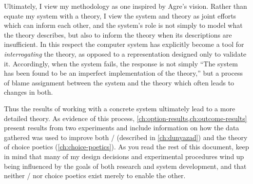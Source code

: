Ultimately, I view my methodology as one inspired by Agre's vision.
%
Rather than equate my system with a theory, I view the system and theory as joint efforts which can inform each other, and the system's role is not simply to model what the theory describes, but also to inform the theory when its descriptions are insufficient.
%
In this respect the computer system has explicitly become a tool for \emph{interrogating} the theory, as opposed to a representation designed only to validate it.
%
Accordingly, when the system fails, the response is not simply ``The system has been found to be an imperfect implementation of the theory,'' but a process of blame assignment between the system and the theory which often leads to changes in both.


Thus the results of working with a concrete system ultimately lead to a more detailed theory.
%
As evidence of this process, \cref{ch:option-results,ch:outcome-results} present results from two experiments and include information on how the data gathered was used to improve both \dunyazad/ (described in \cref{ch:dunyazad}) and the theory of choice poetics (\cref{ch:choice-poetics}).
%
As you read the rest of this document, keep in mind that many of my design decisions and experimental procedures wind up being influenced by the goals of both research and system development, and that neither \dunyazad/ nor choice poetics exist merely to enable the other.
